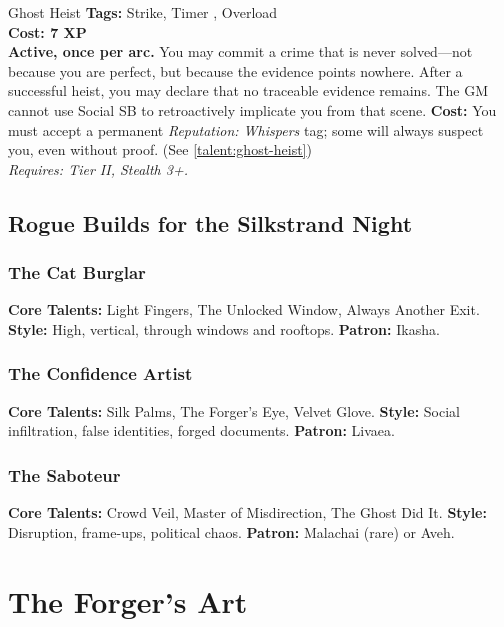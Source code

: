 \documentclass[10pt,twoside]{book}
\begin{document}
\begin{talentbox}{Ghost Heist}
\textbf{Tags:} Strike, Timer , Overload \\
\textbf{Cost: 7 XP} \\
\textbf{Active, once per arc.} You may commit a crime that is never solved---not because you are perfect, but because the evidence points nowhere. After a successful heist, you may declare that no traceable evidence remains. The GM cannot use Social SB to retroactively implicate you from that scene. \textbf{Cost:} You must accept a permanent \textit{Reputation: Whispers} tag; some will always suspect you, even without proof. (See \ref{talent:ghost-heist}) \\
\textit{Requires: Tier II, Stealth 3+.}
\end{talentbox}

\chapter{Rogue Builds for the Silkstrand Night}

\section{The Cat Burglar}
\textbf{Core Talents:} Light Fingers, The Unlocked Window, Always Another Exit.  
\textbf{Style:} High, vertical, through windows and rooftops.  
\textbf{Patron:} Ikasha.

\section{The Confidence Artist}
\textbf{Core Talents:} Silk Palms, The Forger's Eye, Velvet Glove.  
\textbf{Style:} Social infiltration, false identities, forged documents.  
\textbf{Patron:} Livaea.

\section{The Saboteur}
\textbf{Core Talents:} Crowd Veil, Master of Misdirection, The Ghost Did It.  
\textbf{Style:} Disruption, frame-ups, political chaos.  
\textbf{Patron:} Malachai (rare) or Aveh.

\part{The Forger's Art}
\end{document}
